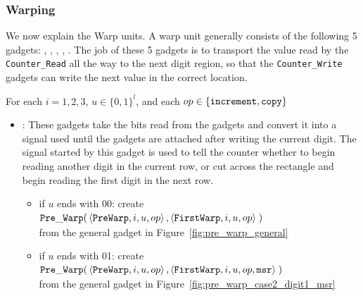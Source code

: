 \subsubsection{ Warping }

We now explain the Warp units. A warp unit generally consists of the following 5 gadgets: \prewarp,
\firstwarp, \warpbridge, \secondwarp, \postwarp. The job of these 5 gadgets is to transport the value
read by the {\tt Counter\_Read} all the way to the next digit region, so that the
{\tt Counter\_Write} gadgets can write the next value in the correct location.



    For each $i = 1, 2, 3$, $u \in \{0, 1\}^l$, and each $op \in \{ {\tt increment, copy } \}$
    \begin{itemize}
        \item {\prewarp}: These gadgets take the bits read from the {\dreader} gadgets and convert it into
                          a signal used until the {\dtop} gadgets are attached after writing the current digit.
                          The signal started by this gadget is used to tell the counter whether to begin reading
                          another digit in the current row, or cut across the rectangle and begin reading the
                          first digit in the next row.


            \begin{itemize}

            \item if $u$ ends with 00:
            create
            $\begin{aligned}[t]
                {\tt Pre\_Warp}(& \left\langle {\tt PreWarp},   i, u, op \right\rangle,
                           \left\langle {\tt FirstWarp}, i, u, op \right\rangle \;)
            \end{aligned}$ \\ from the general gadget in Figure~\ref{fig:pre_warp_general}

            \item if $u$ ends with 01:
            create
            $\begin{aligned}[t]
                {\tt Pre\_Warp}(& \left\langle {\tt PreWarp},   i, u, op \right\rangle,
                           \left\langle {\tt FirstWarp}, i, u, op, {\tt msr} \right\rangle \;)
            \end{aligned}$ \\ from the general gadget in Figure~\ref{fig:pre_warp_case2_digit1_msr}


\end{itemize}
\end{itemize}
